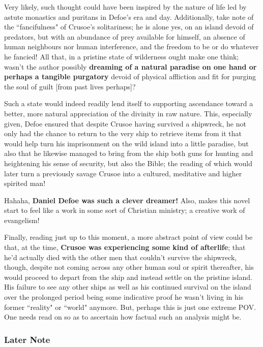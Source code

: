 \documentclass[a4paper]{article}
\begin{document}
Very likely, such thought could have been inspired by the nature of life led by astute monastics and puritans in Defoe's era and day. Additionally, take note of the ``fancifulness" of Crusoe's solitariness; he is alone yes, on an island devoid of predators, but with an abundance of prey available for himself, an absence of human neighbours nor human interference, and the freedom to be or do whatever he fancied! All that, in a pristine state of wilderness ought make one think; wasn't the author possibly \textbf{dreaming of a natural paradise on one hand or perhaps a tangible purgatory} devoid of physical affliction and fit for purging the soul of guilt [from past lives perhaps]? 


Such a state would indeed readily lend itself to supporting ascendance toward a better, more natural appreciation of the divinity in raw nature. This, especially given, Defoe ensured that despite Crusoe having survived a shipwreck, he not only had the chance to return to the very ship to retrieve items from it that would help turn his imprisonment on the wild island into a little paradise, but also that he likewise managed to bring from the ship both guns for hunting and heightening his sense of security, but also the Bible; the reading of which would later turn a previously savage Crusoe into a cultured, meditative and higher spirited man!


Hahaha, \textbf{Daniel Defoe was such a clever dreamer!} Also, makes this novel start to feel like a work in some sort of Christian ministry; a creative work of evangelism!

Finally, reading just up to this moment, a more abstract point of view could be that, at the time, \textbf{Crusoe was experiencing some kind of afterlife}; that he'd actually died with the other men that couldn't survive the shipwreck, though, despite not coming across any other human soul or spirit thereafter, his would proceed to depart from the ship and instead settle on the pristine island. His failure to see any other ships as well as his continued survival on the island over the prolonged period being some indicative proof he wasn't living in his former ``reality" or ``world" anymore. But, perhaps this is just one extreme POV. One needs read on so as to ascertain how factual such an analysis might be.


\subsubsection{Later Note}
\end{document}
